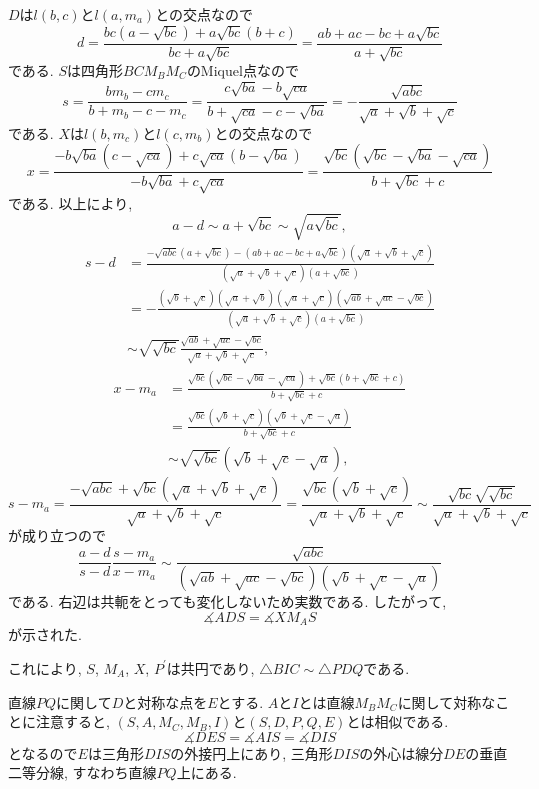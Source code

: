 \begin{ifsol*}
$D$は$l(b,c)$と$l(a,m_a)$との交点なので
\[d=\frac{bc(a-\sqrt{bc})+a\sqrt{bc}(b+c)}{bc+a\sqrt{bc}}=\frac{ab+ac-bc+a\sqrt{bc}}{a+\sqrt{bc}}\]
である.
$S$は四角形$BCM_BM_C$のMiquel点なので
\[s=\frac{bm_b-cm_c}{b+m_b-c-m_c}=\frac{c\sqrt{ba}-b\sqrt{ca}}{b+\sqrt{ca}-c-\sqrt{ba}}=-\frac{\sqrt{abc}}{\sqrt{a}+\sqrt{b}+\sqrt{c}}\]
である.
$X$は$l(b,m_c)$と$l(c,m_b)$との交点なので
\[x=\frac{-b\sqrt{ba}(c-\sqrt{ca})+c\sqrt{ca}(b-\sqrt{ba})}{-b\sqrt{ba}+c\sqrt{ca}}=\frac{\sqrt{bc}(\sqrt{bc}-\sqrt{ba}-\sqrt{ca})}{b+\sqrt{bc}+c}\]
である.
以上により,
\[a-d\sim a+\sqrt{bc}\sim\sqrt{a\sqrt{bc}},\]
\begin{align*}
s-d
&=\frac{-\sqrt{abc}(a+\sqrt{bc})-(ab+ac-bc+a\sqrt{bc})(\sqrt{a}+\sqrt{b}+\sqrt{c})}{(\sqrt{a}+\sqrt{b}+\sqrt{c})(a+\sqrt{bc})}\\
&=-\frac{(\sqrt{b}+\sqrt{c})(\sqrt{a}+\sqrt{b})(\sqrt{a}+\sqrt{c})(\sqrt{ab}+\sqrt{ac}-\sqrt{bc})}{(\sqrt{a}+\sqrt{b}+\sqrt{c})(a+\sqrt{bc})}\\
&\sim\sqrt{\sqrt{bc}}\frac{\sqrt{ab}+\sqrt{ac}-\sqrt{bc}}{\sqrt{a}+\sqrt{b}+\sqrt{c}},
\end{align*}
\begin{align*}
x-m_a
&=\frac{\sqrt{bc}(\sqrt{bc}-\sqrt{ba}-\sqrt{ca})+\sqrt{bc}(b+\sqrt{bc}+c)}{b+\sqrt{bc}+c}\\
&=\frac{\sqrt{bc}(\sqrt{b}+\sqrt{c})(\sqrt{b}+\sqrt{c}-\sqrt{a})}{b+\sqrt{bc}+c}\\
&\sim\sqrt{\sqrt{bc}}(\sqrt{b}+\sqrt{c}-\sqrt{a}),
\end{align*}
\[s-m_a=\frac{-\sqrt{abc}+\sqrt{bc}(\sqrt{a}+\sqrt{b}+\sqrt{c})}{\sqrt{a}+\sqrt{b}+\sqrt{c}}=\frac{\sqrt{bc}(\sqrt{b}+\sqrt{c})}{\sqrt{a}+\sqrt{b}+\sqrt{c}}\sim\frac{\sqrt{bc}\sqrt{\sqrt{bc}}}{\sqrt{a}+\sqrt{b}+\sqrt{c}}\]
が成り立つので
\[\frac{a-d}{s-d}\frac{s-m_a}{x-m_a}\sim\frac{\sqrt{abc}}{(\sqrt{ab}+\sqrt{ac}-\sqrt{bc})(\sqrt{b}+\sqrt{c}-\sqrt{a})}\]
である.
右辺は共軛をとっても変化しないため実数である.
したがって,
\[\measuredangle ADS=\measuredangle XM_AS\]
が示された.

これにより, $S$, $M_A$, $X$, $P^\prime$は共円であり, $\triangle BIC\sim\triangle PDQ$である.

直線$PQ$に関して$D$と対称な点を$E$とする.
$A$と$I$とは直線$M_BM_C$に関して対称なことに注意すると, $(S,A,M_C,M_B,I)$と$(S,D,P,Q,E)$とは相似である.
\[\measuredangle DES=\measuredangle AIS=\measuredangle DIS\]
となるので$E$は三角形$DIS$の外接円上にあり, 三角形$DIS$の外心は線分$DE$の垂直二等分線, すなわち直線$PQ$上にある.
\end{ifsol*}